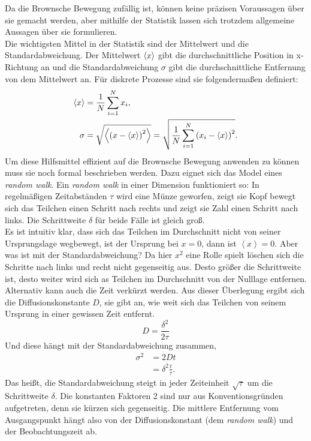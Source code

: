 Da die Brownsche Bewegung zufällig ist, können keine präzisen Voraussagen über sie gemacht werden, aber mithilfe der Statistik lassen sich trotzdem allgemeine Aussagen über sie formulieren.\\
Die wichtigsten Mittel in der Statistik sind der Mittelwert und die Standardabweichung. Der Mittelwert $\left< x \right>$ gibt die durchschnittliche Position in x-Richtung an und die Standardabweichung $\sigma$ gibt die durchschnittliche Entfernung von dem Mittelwert an. Für diskrete Prozesse sind sie folgendermaßen definiert:
\begin{align}
  \left< x \right> & = \frac{1}{N} \sum_{i=1}^{N} x_i, \\
  \sigma & = \sqrt{\left<  {\left( x - \left< x \right> \right)}^2  \right>} = \sqrt{\frac{1}{N} \sum_{i=1}^{N} {\left( x_i - \left< x \right> \right)}^2}.
\end{align}
Um diese Hilfsmittel effizient auf die Brownsche Bewegung anwenden zu können muss sie noch formal beschrieben werden. Dazu eignet sich das Model eines \textit{random walk}. Ein \textit{random walk} in einer Dimension funktioniert so: In regelmäßigen Zeitabständen $\tau$ wird eine Münze geworfen, zeigt sie Kopf bewegt sich das Teilchen einen Schritt nach rechts und zeigt sie Zahl einen Schritt nach links. Die Schrittweite $\delta$ für beide Fälle ist gleich groß.\\
Es ist intuitiv klar, dass sich das Teilchen im Durchschnitt nicht von seiner Ursprungslage wegbewegt, ist der Ursprung bei $x = 0$, dann ist $\left< x \right> = 0$. Aber was ist mit der Standardabweichung? Da hier $x^2$ eine Rolle spielt löschen sich die Schritte nach links und recht nicht gegenseitig aus.
Desto größer die Schrittweite ist, desto weiter wird sich as Teilchen im Durchschnitt von der Nulllage entfernen. Alternativ kann auch die Zeit verkürzt werden. Aus dieser Überlegung ergibt sich die Diffusionskonstante $D$, sie gibt an, wie weit sich das Teilchen von seinem Ursprung in einer gewissen Zeit entfernt.
\begin{equation}
  D = \frac{\delta^2}{2 \tau}
\end{equation}
Und diese hängt mit der Standardabweichung zusammen,
\begin{align}
  \sigma^2 & = 2Dt \label{eq:diff} \\
   & = \delta^2 \frac{t}{\tau}.
\end{align}
Das heißt, die Standardabweichung steigt in jeder Zeiteinheit $\sqrt{\tau}$ um die Schrittweite $\delta$. Die konstanten Faktoren 2 sind nur aus Konventionsgründen aufgetreten, denn sie kürzen sich gegenseitig. Die mittlere Entfernung vom Ausgangspunkt hängt also von der Diffusionskonstant (dem \textit{random walk}) und der Beobachtungszeit ab.\\
